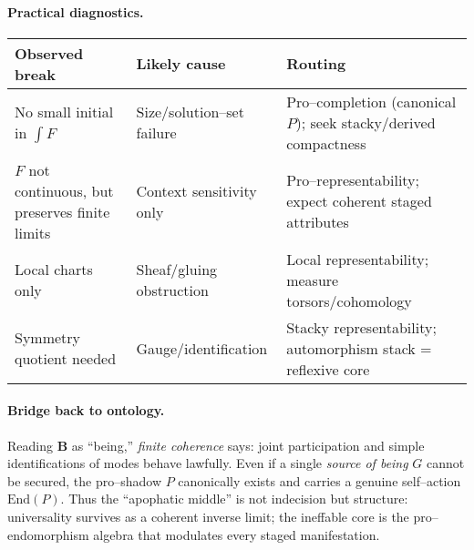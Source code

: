 \documentclass[11pt]{article}
\theoremstyle{upright}
\begin{document}
\paragraph{Practical diagnostics.}
\begin{center}\small
\begin{tabular}{p{3.7cm}p{5.2cm}p{5.5cm}}
\toprule
\textbf{Observed break} & \textbf{Likely cause} & \textbf{Routing} \\
\midrule
No small initial in $\int F$ & Size/solution–set failure & Pro–completion (canonical $P$); seek stacky/derived compactness \\
$F$ not continuous, but preserves finite limits & Context sensitivity only & Pro–representability; expect coherent staged attributes \\
Local charts only & Sheaf/gluing obstruction & Local representability; measure torsors/cohomology \\
Symmetry quotient needed & Gauge/identification & Stacky representability; automorphism stack = reflexive core \\
\bottomrule
\end{tabular}
\end{center}

\paragraph{Bridge back to ontology.}
Reading $\mathbf B$ as ``being,'' \emph{finite coherence} says: joint participation and simple identifications of modes behave lawfully. Even if a single \emph{source of being} $G$ cannot be secured, the pro–shadow $P$ canonically exists and carries a genuine self–action $\mathrm{End}(P)$. Thus the ``apophatic middle'' is not indecision but structure: universality survives as a coherent inverse limit; the ineffable core is the pro–endomorphism algebra that modulates every staged manifestation.
\end{document}
